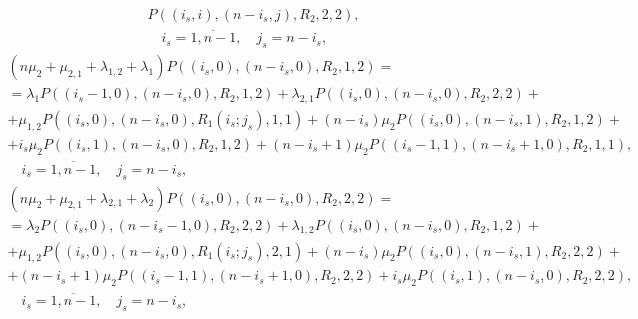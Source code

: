\documentclass[default]{subfiles}
\begin{document}
{\begin{multline}
  P\left((i_s,i),(n-i_s,j),R_2,2,2\right), \\
  \quad i_s=\overline{1,n-1}, \quad j_s=n-i_s,
\label{eq:9.2}
\end{multline}
\begin{multline}
  \left(n\mu_2+\mu_{2,1}+\lambda_{1,2}+\lambda_1 \right)
  P\left((i_s,0),(n-i_s,0),R_2,1,2\right) = \\ =
  \lambda_1 P\left((i_s-1,0),(n-i_s,0),R_2,1,2\right)+ \lambda_{2,1}
  P\left((i_s,0),(n-i_s,0),R_2,2,2\right)+ \\ +
  \mu_{1,2} P\left((i_s,0),(n-i_s,0),R_1(i_s;j_s),1,1\right)+
  (n-i_s)\mu_2 P\left((i_s,0),(n-i_s,1),R_2,1,2\right) +\\ +
  i_s\mu_2 P\left((i_s,1),(n-i_s,0),R_2,1,2\right) + (n-i_s+1)\mu_2  P\left((i_s-1,1),(n-i_s+1,0),R_2,1,1\right), \\
  \quad i_s=\overline{1,n-1}, \quad j_s=n-i_s,
\label{eq:9.3}
\end{multline}
\begin{multline}
  \left(n\mu_2+\mu_{2,1}+\lambda_{2,1}+\lambda_2 \right)
  P\left((i_s,0),(n-i_s,0),R_2,2,2\right) = \\ = \lambda_2
  P\left((i_s,0),(n-i_s-1,0),R_2,2,2\right)+ \lambda_{1,2}
  P\left((i_s,0),(n-i_s,0),R_2,1,2\right)+ \\ + \mu_{1,2}
  P\left((i_s,0),(n-i_s,0),R_1(i_s;j_s),2,1\right)+ (n-i_s)\mu_2
  P\left((i_s,0),(n-i_s,1),R_2,2,2\right)+\\ +
  (n-i_s+1)\mu_2 P\left((i_s-1,1),(n-i_s+1,0),R_2,2,2\right)+  i_s\mu_2  P\left((i_s,1),(n-i_s,0),R_2,2,2\right), \\
  \quad i_s=\overline{1,n-1}, \quad j_s=n-i_s,
\label{eq:9.4}
\end{multline}

}
\end{document}
